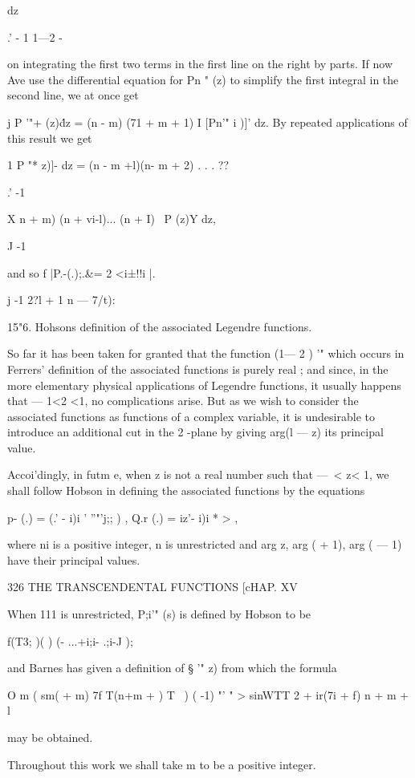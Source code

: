 {{{dz



.' - 1 1—2 -

on integrating the first two terms in the first line on the right by
parts. If now Ave use the differential equation for Pn " (z) to
simplify the first integral in the second line, we at once get

j P '"+ (z)\' dz = (n - m) (71 + m + 1) I [Pn'" i )]' dz. By repeated
applications of this result we get

1 P "* z)]- dz = (n - m +l)(n- m + 2) . . . ??

.' -1

X n + m) (n + vi-l)... (n + I) \ P (z)Y dz,

J -1

and so f |P.-(.);.\&= 2 <i±!!i |.

j -1 2?l + 1 n — 7/t):

15"6. Hohsons definition of the associated Legendre functions.

So far it has been taken for granted that the function (1— 2 ) '"
which occurs in Ferrers' definition of the associated functions is
purely real ; and since, in the more elementary physical applications
of Legendre functions, it usually happens that — 1<2 <1, no
complications arise. But as we wish to consider the associated
functions as functions of a complex variable, it is undesirable to
introduce an additional cut in the 2 -plane by giving arg(l — z) its
principal value.

Accoi'dingly, in futm e, when z is not a real number such that —\ < z<
1, we shall follow Hobson in defining the associated functions by the
equations

p- (.) = (.' - i)i ' ''"'j;; ) , Q.r (.) = iz'- i)i * > ,

where ni is a positive integer, n is unrestricted and arg z, arg ( +
1), arg ( — 1) have their principal values.



326 THE TRANSCENDENTAL FUNCTIONS [cHAP. XV

When 111 is unrestricted, P;i'" (s) is defined by Hobson to be

f(T3; )( ) (- ...+i;i- .;i-J );

and Barnes has given a definition of § '" z) from which the formula

O m ( sm( + m) 7f T(n+m + ) T \ ) ( -1) "' " > sinWTT 2 + ir(7i + f) n
+ m + l

may be obtained.

Throughout this work we shall take m to be a positive integer.

}}}
